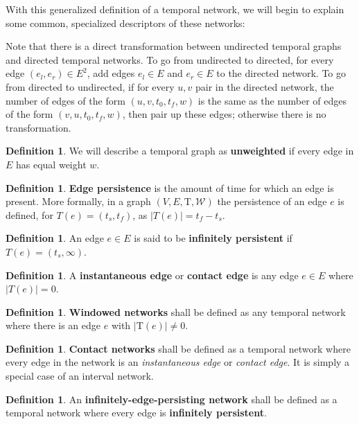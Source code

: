 \documentclass{article}
\theoremstyle{definition}
\newtheorem{defn}[thm]{Definition}
\numberwithin{thm}{subsection}
\newcommand{\W}{\mathcal{W}}
\newcommand{\T}{\text{T}}
\begin{document}
With this generalized definition of a temporal network, we will begin to explain
some common, specialized descriptors of these networks:

Note that there is a direct transformation between undirected temporal graphs and
directed temporal networks. To go from undirected to directed, for every edge
$(e_l,e_r) \in E^2$, add edges $e_l \in E$ and $e_r \in E$ to the directed
network. To go from directed to undirected, if for every $u,v$ pair in the
directed network, the number of edges of the form $(u,v,t_0,t_f,w)$ is the same
as the number of edges of the form $(v,u,t_0,t_f,w)$, then pair up these edges;
otherwise there is no transformation.

\begin{defn}
  We will describe a temporal graph as \textbf{unweighted} if every edge in $E$
  has equal weight $w$.
\end{defn}

\begin{defn}
  \textbf{Edge persistence} is the amount of time for which an edge is present.
  More formally, in a graph $(V,E,\T,\W)$ the persistence of an edge $e$
  is defined, for $T(e) = (t_s,t_f)$, as $|T(e)| = t_f - t_s$.
\end{defn}

\begin{defn}
  An edge $e \in E$ is said to be \textbf{infinitely persistent} if
  $T(e) = (t_s, \infty)$.
\end{defn}

\begin{defn}
  A \textbf{instantaneous edge} or \textbf{contact edge} is any edge $e \in E$
  where $|T(e)| = 0$.
\end{defn}

\begin{defn}
  \textbf{Windowed networks} shall be defined as any temporal network where
  there is an edge $e$ with $|\T(e)| \neq 0$.
\end{defn}

\begin{defn}
  \textbf{Contact networks} shall be defined as a temporal network where
  every edge in the network is an \textit{instantaneous edge} or \textit{contact
  edge}. It is simply a special case of an interval network.
\end{defn}

\begin{defn}
  An \textbf{infinitely-edge-persisting network} shall be defined as a temporal
  network where every edge is \textbf{infinitely persistent}.
\end{defn}
\end{document}
